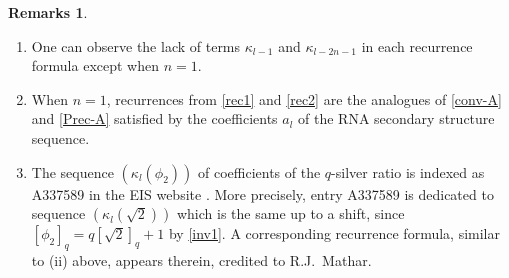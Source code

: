 \documentclass[11pt,reqno]{amsart}
\theoremstyle{plain}
\theoremstyle{definition}
\newtheorem{remarques}[lemme]{Remarks}
\numberwithin{figure}{section}
\numberwithin{table}{section}
\numberwithin{equation}{section}
\newcommand\ka{\kappa}
\begin{document}
\begin{remarques}
\begin{enumerate}[wide]
\item One can observe the lack of  terms $\ka_{l-1}$ and $\ka_{l-2n-1}$ in each recurrence formula except when $n=1$. 
\item When $n=1$, recurrences from \cref{rec1} and \cref{rec2} are the analogues of \eqref{conv-A} and \eqref{Prec-A} satisfied by the coefficients $a_l$ of the RNA secondary structure sequence. 
\item The sequence $(\ka_l(\phi_2))$ of coefficients of the $q$-silver ratio is indexed as A337589 in the EIS website \cite{oeis}. More precisely,  entry A337589 is dedicated to  sequence $(\ka_l(\sqrt{2}))$ which is the same up to a shift, since $[\phi_2]_q=q[\sqrt{2}]_q+1$ by \eqref{inv1}. A corresponding recurrence formula, similar to (ii) above, appears therein, credited to R.J.~Mathar.
\end{enumerate}
\end{remarques}
\end{document}
